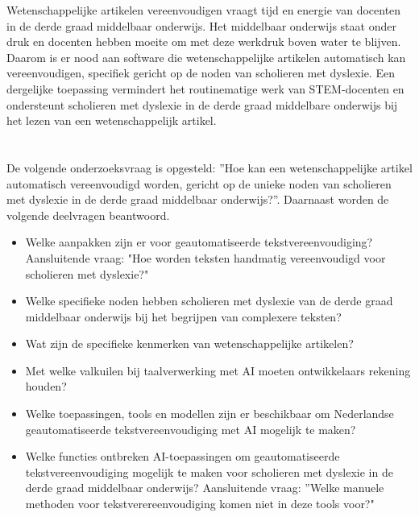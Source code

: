 Wetenschappelijke artikelen vereenvoudigen vraagt tijd en energie van docenten in de derde graad middelbaar onderwijs. Het middelbaar onderwijs staat onder druk en docenten hebben moeite om met deze werkdruk boven water te blijven. Daarom is er nood aan software die wetenschappelijke artikelen automatisch kan vereenvoudigen, specifiek gericht op de noden van scholieren met dyslexie. Een dergelijke toepassing vermindert het routinematige werk van STEM-docenten en ondersteunt scholieren met dyslexie in de derde graad middelbare onderwijs bij het lezen van een wetenschappelijk artikel.

\section{}%
\label{sec:onderzoeksvraag}

De volgende onderzoeksvraag is opgesteld: ”Hoe kan een wetenschappelijke artikel automatisch vereenvoudigd worden, gericht op de unieke noden van scholieren met dyslexie in de derde graad middelbaar onderwijs?”. Daarnaast worden de volgende deelvragen beantwoord.

\begin{itemize}
	\item Welke aanpakken zijn er voor geautomatiseerde tekstvereenvoudiging? Aansluitende vraag: "Hoe worden teksten handmatig vereenvoudigd voor scholieren met dyslexie?"
	\item Welke specifieke noden hebben scholieren met dyslexie van de derde graad middelbaar onderwijs bij het begrijpen van complexere teksten?
	\item Wat zijn de specifieke kenmerken van wetenschappelijke artikelen?
	\item Met welke valkuilen bij taalverwerking met AI moeten ontwikkelaars rekening houden?
	\item Welke toepassingen, tools en modellen zijn er beschikbaar om Nederlandse geautomatiseerde tekstvereenvoudiging met AI mogelijk te maken?
	\item Welke functies ontbreken AI-toepassingen om geautomatiseerde tekstvereenvoudiging mogelijk te maken voor scholieren met dyslexie in de derde graad middelbaar onderwijs? Aansluitende vraag: ”Welke manuele methoden voor tekstverereenvoudiging komen niet in deze tools voor?"
\end{itemize}


\section{}%
\label{sec:onderzoeksdoelstelling}

